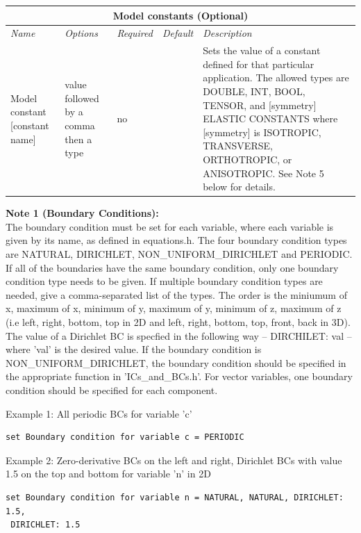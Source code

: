 \documentclass[10pt]{article} %
\begin{document}
\begin{center}
    \begin{tabular}{ | p{} | p{} | p{} | p{} | p{} |}
    \hline
      \multicolumn{5}{|c|}{\textbf{Model constants (Optional)}} \\
    \hline
    \hline
    \emph{Name} & \emph{Options} & \emph{Required} & \emph{Default} & \emph{Description} \\ \hline
    Model constant [constant name] & value followed by a comma then a type & no &  & Sets the value of a constant defined for that particular application. The allowed types are DOUBLE, INT, BOOL, TENSOR, and [symmetry] ELASTIC CONSTANTS where [symmetry] is ISOTROPIC, TRANSVERSE, ORTHOTROPIC, or ANISOTROPIC. See Note 5 below for details. \\ \hline
    \end{tabular}
\end{center}

\normalsize

\textbf{Note 1 (Boundary Conditions):} \\
The boundary condition must be set for each variable, where each variable is given by its name, as defined in equations.h. The four boundary condition types are NATURAL, DIRICHLET, NON\_UNIFORM\_DIRICHLET and PERIODIC. If all of the boundaries have the same boundary condition, only one boundary condition type needs to be given. If multiple boundary condition types are needed, give a comma-separated list of the types. The order is the miniumum of x, maximum of x, minimum of y, maximum of y, minimum of z, maximum of z (i.e left, right, bottom, top in 2D and left, right, bottom, top, front, back in 3D). The value of a Dirichlet BC is specfied in the following way -- DIRCHILET: val -- where 'val' is the desired value. If the boundary condition is NON\_UNIFORM\_DIRICHLET, the boundary condition should be specified in the appropriate function in 'ICs\_and\_BCs.h'. For vector variables, one boundary condition should be specified for each component.

Example 1: All periodic BCs for variable 'c'
\begin{lstlisting}
set Boundary condition for variable c = PERIODIC
\end{lstlisting}

Example 2: Zero-derivative BCs on the left and right, Dirichlet BCs with value 1.5 on the top and bottom for variable 'n' in 2D
\begin{lstlisting}
set Boundary condition for variable n = NATURAL, NATURAL, DIRICHLET: 1.5,
 DIRICHLET: 1.5
\end{lstlisting}
\end{document}
